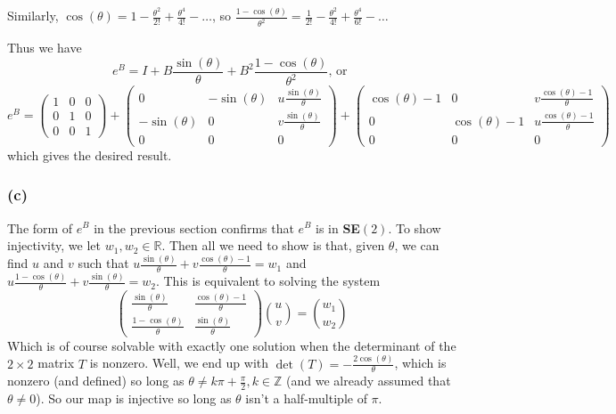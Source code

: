 \documentclass{article}
\newcommand{\reals}{\mathbb{R}}
\newcommand{\ints}{\mathbb{Z}}
\begin{document}
\noindent
Similarly, $\cos(\theta) = 1 - \frac{\theta^2}{2!} + \frac{\theta^4}{4!} - \dots $, so
$\frac{1 - \cos(\theta)}{\theta^2} = \frac{1}{2!} - \frac{\theta^2}{4!} + \frac{\theta^4}{6!} - \dots $

\noindent
Thus we have
\[e^B = I + B\frac{\sin(\theta)}{\theta} + B^2 \frac{1 - \cos(\theta)}{\theta^2} \text{, or }\]
\[
  e^B = 
\left(\begin{array}{ccc}
  1 & 0 & 0 \\
  0 & 1 & 0 \\
  0 & 0 & 1 
\end{array}\right) 
+
\left(\begin{array}{ccc}
  0 & -\sin(\theta) & u\frac{\sin(\theta)}{\theta} \\
  -\sin(\theta) & 0 & v\frac{\sin(\theta)}{\theta} \\
  0 & 0 & 0 
\end{array}\right) 
+
\left(\begin{array}{ccc}
  \cos(\theta) - 1 & 0 & v\frac{\cos(\theta) - 1}{\theta} \\
  0 & \cos(\theta) - 1 & u\frac{\cos(\theta) - 1}{\theta} \\
  0 & 0 & 0 
\end{array}\right) 
\]
which gives the desired result.

\subsubsection{(c)}
The form of $e^B$ in the previous section confirms that $e^B$ is in \textbf{SE}$(2)$.
To show injectivity, we let $w_1,w_2 \in \reals$.
Then all we need to show is that, given $\theta$, we can find $u$ and $v$ such that
$u\frac{\sin(\theta)}{\theta} + v \frac{\cos(\theta) - 1}{\theta} = w_1$ and
$u\frac{1-\cos(\theta)}{\theta} + v \frac{\sin(\theta)}{\theta} = w_2$.
This is equivalent to solving the system
\[
\left(\begin{array}{cc}
\frac{\sin(\theta)}{\theta} & \frac{\cos(\theta) - 1}{\theta} \\
\frac{1-\cos(\theta)}{\theta} & \frac{\sin(\theta)}{\theta}
\end{array}\right)
\binom{u}{v} = \binom{w_1}{w_2} %
\]
Which is of course solvable with exactly one solution when the determinant of the $2\times2$ matrix $T$ is nonzero.
Well, we end up with $\det(T) = -\frac{2\cos(\theta)}{\theta}$, which is nonzero (and defined) so long as $\theta \neq k\pi + \frac{\pi}{2}, k \in \ints$ (and we already assumed that $\theta \neq 0$).
So our map is injective so long as $\theta$ isn't a half-multiple of $\pi$.
\end{document}
